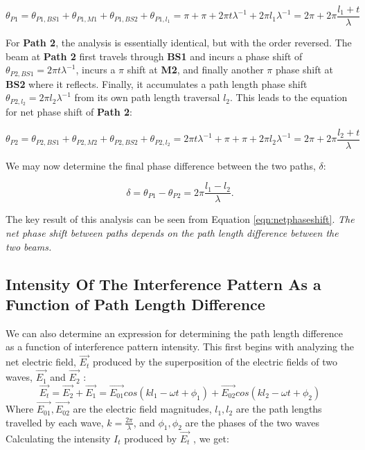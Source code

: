 \documentclass{article}
\begin{document}
\begin{equation}\label{eqn:phaseshiftp1}
    \theta_{P1} = \theta_{P1,BS1} + \theta_{P1,M1} + \theta_{P1,BS2} + \theta_{P1,l_1} = \pi + \pi + 2\pi{t}\lambda^{-1} + 2\pi{l_1}\lambda^{-1} = 2\pi + 2\pi\dfrac{l_1 + t}{\lambda}
\end{equation}

For \textbf{Path 2}, the analysis is essentially identical, but with the order reversed. The beam at \textbf{Path 2} first travels through \textbf{BS1} and incurs a phase shift of $\theta_{P2,BS1} = 2\pi{t}\lambda^{-1}$, incurs a $\pi$ shift at \textbf{M2}, and finally another $\pi$ phase shift at \textbf{BS2} where it reflects. Finally, it accumulates a path length phase shift
$\theta_{P2,l_2} = 2\pi{l_2}\lambda^{-1}$ from its own path length traversal $l_2$. This leads to the equation for net phase shift of \textbf{Path 2}\cite[pg. 48]{Zetie_2000}:

\begin{equation}\label{eqn:phaseshiftp2}
    \theta_{P2} = \theta_{P2,BS1} + \theta_{P2,M2} + \theta_{P2,BS2} + \theta_{P2,l_2} = 2\pi{t}\lambda^{-1} + \pi + \pi +2\pi{l_2}\lambda^{-1} = 2\pi + 2\pi\dfrac{l_2 + t}{\lambda}
\end{equation}

\par

We may now determine the final phase difference between the two paths, $\delta$\cite[pg. 48]{Zetie_2000}:

\begin{equation}\label{eqn:netphaseshift}
    \delta = \theta_{P1} - \theta_{P2} = 2\pi\dfrac{l_1 - l_2}{\lambda}.
\end{equation}

The key result of this analysis can be seen from Equation \ref{eqn:netphaseshift}. \textit{The net phase shift between paths depends on the path length difference between the two beams.}

\subsection{  Intensity Of The Interference Pattern As a Function of Path Length Difference }\label{sec:intensity_of_the_interference_pattern_as_a_function_of_path_length_difference }\label{subsec:_intensity_of_the_interference_pattern_as_a_function_of_path_length_difference_}\label{sec:intensity_of_the_interference_pattern_as_a_function_of_path_length_difference}
We can also determine an expression for determining the path length difference as a function of interference pattern intensity.
This first begins with analyzing the net electric field, $\vec{E_t}$ produced by the superposition of the electric fields of two waves, $\vec{E_1}$ and $\vec{E_2}$ :
\begin{equation}
	\vec{E_t} = \vec{E_2} + \vec{E_1} = \vec{E_{01}}cos(kl_1 - \omega{t} + \phi_1) + \vec{E_{02}}cos(kl_2 - \omega{t} + \phi_2)
\end{equation}
Where $\vec{E_{01}},\vec{E_{02}}$  are the electric field magnitudes, $l_1,l_2$ are the path lengths travelled by each wave, $k = \frac{2\pi}{\lambda}$, and $\phi_1, \phi_2$ are the phases of the two waves Calculating the intensity $I_t$ produced by $\vec{E_t}$ , we get:
\end{document}
